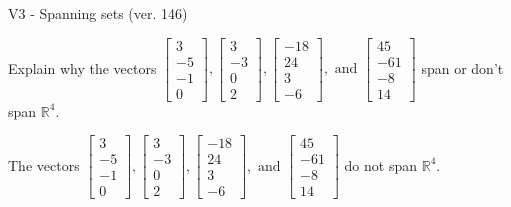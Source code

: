 \begin{exercise}
  \begin{exerciseTitle}V3 - Spanning sets (ver. 146)\end{exerciseTitle}
  \begin{exerciseStatement}
    Explain why the vectors \(\left[\begin{array}{r}
3 \\
-5 \\
-1 \\
0
\end{array}\right] , \left[\begin{array}{r}
3 \\
-3 \\
0 \\
2
\end{array}\right] , \left[\begin{array}{r}
-18 \\
24 \\
3 \\
-6
\end{array}\right] , \text{ and } \left[\begin{array}{r}
45 \\
-61 \\
-8 \\
14
\end{array}\right]\) span or don't span \(\mathbb{R}^4\). 
	


  \end{exerciseStatement}
  \begin{exerciseAnswer}
   The vectors \(\left[\begin{array}{r}
3 \\
-5 \\
-1 \\
0
\end{array}\right] , \left[\begin{array}{r}
3 \\
-3 \\
0 \\
2
\end{array}\right] , \left[\begin{array}{r}
-18 \\
24 \\
3 \\
-6
\end{array}\right] , \text{ and } \left[\begin{array}{r}
45 \\
-61 \\
-8 \\
14
\end{array}\right]\) 
  	 do not  
	span \(\mathbb{R}^4\).
  


  \end{exerciseAnswer}
\end{exercise}